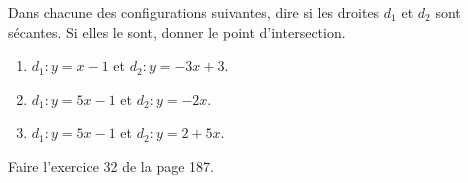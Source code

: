 
\begin{exercice}\label{exosmath-0084}

    Dans chacune des configurations suivantes, dire si les droites \( d_1\) et \( d_2\) sont sécantes. Si elles le sont, donner le point d'intersection.
    \begin{enumerate}
        \item
            \( d_1 : y=x-1\) et \( d_2:y=-3x+3\).
        \item
            \( d_1:y= 5x-1\) et \( d_2:y= -2x\).
        \item
            \( d_1:y= 5x-1\) et \( d_2:y= 2+5x\).
    \end{enumerate}

    Faire l'exercice 32 de la page 187.

\end{exercice}
